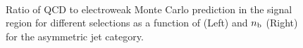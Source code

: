 \begin{figure}[h!]
\begin{center}
     ~~
     \\
      \caption{ Ratio of QCD to electroweak Monte Carlo prediction in the signal region for different \scalht selections as a function of \mht (Left) and $n_{\text{b}}$ (Right) for the asymmetric jet category.
    }
    \label{fig:sym_qcd_validation}
  \end{center} 
\end{figure}
